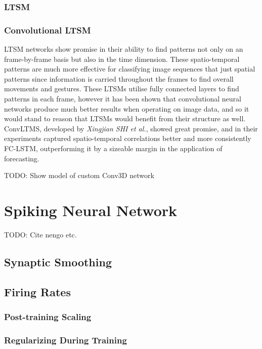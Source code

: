 \subsubsection{LTSM}

\subsubsection{Convolutional LTSM}

LTSM networks show promise in their ability to find patterns not only on an frame-by-frame basis but also in the time dimension. These spatio-temporal patterns are much more effective for classifying image sequences that just spatial patterns since information is carried throughout the frames to find overall movements and gestures. These LTSMs utilise fully connected layers to find patterns in each frame, however it has been shown that convolutional neural networks produce much better results when operating on image data, and so it would stand to reason that LTSMs would benefit from their structure as well. ConvLTMS, developed by \textit{Xingjian SHI et al.}, showed great promise, and in their experiments captured spatio-temporal correlations better and more consistently FC-LSTM, outperforming it by a sizeable margin in the application of forecasting.

\color{red} TODO: Show model of custom Conv3D network \color{black}

\section{Spiking Neural Network}

\color{red} TODO: Cite nengo etc. \color{black}

\subsection{Synaptic Smoothing}

\subsection{Firing Rates}

\subsubsection{Post-training Scaling}

\subsubsection{Regularizing During Training}